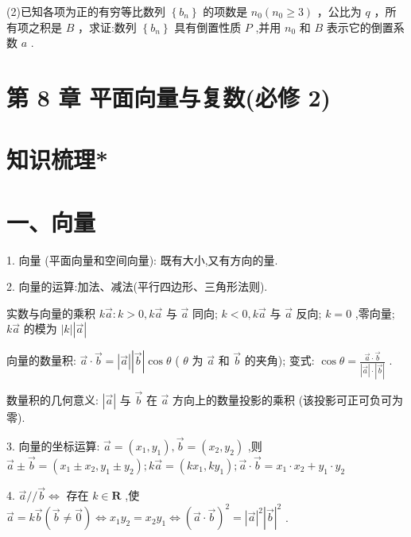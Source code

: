 (2)已知各项为正的有穷等比数列 $\left\{  {b}_{n}\right\}$ 的项数是 ${n}_{0}\left( {{n}_{0} \geq  3}\right)$ ，公比为 $q$ ，所有项之积是 $B$ ，求证:数列 $\left\{  {b}_{n}\right\}$ 具有倒置性质 $P$ ,并用 ${n}_{0}$ 和 $B$ 表示它的倒置系数 $a$ .


\section*{第 8 章 平面向量与复数(必修 2)}

\section*{知识梳理*}

\section*{一、向量}

1. 向量 (平面向量和空间向量): 既有大小,又有方向的量.

2. 向量的运算:加法、减法(平行四边形、三角形法则).

实数与向量的乘积 $k\overrightarrow{a} : k > 0,k\overrightarrow{a}$ 与 $\overrightarrow{a}$ 同向; $k < 0,k\overrightarrow{a}$ 与 $\overrightarrow{a}$ 反向; $k = 0$ ,零向量; $k\overrightarrow{a}$ 的模为 $\left| k\right| \left| \overrightarrow{a}\right|$

向量的数量积: $\overrightarrow{a} \cdot  \overrightarrow{b} = \left| \overrightarrow{a}\right| \left| \overrightarrow{b}\right| \cos \theta$ ( $\theta$ 为 $\overrightarrow{a}$ 和 $\overrightarrow{b}$ 的夹角); 变式: $\cos \theta  = \frac{\overrightarrow{a} \cdot  \overrightarrow{b}}{\left| \overrightarrow{a}\right|  \cdot  \left| \overrightarrow{b}\right| }$ .

数量积的几何意义: $\left| \overrightarrow{a}\right|$ 与 $\overrightarrow{b}$ 在 $\overrightarrow{a}$ 方向上的数量投影的乘积 (该投影可正可负可为零).

3. 向量的坐标运算: $\overrightarrow{a} = \left( {{x}_{1},{y}_{1}}\right) ,\overrightarrow{b} = \left( {{x}_{2},{y}_{2}}\right)$ ,则 $\overrightarrow{a} \pm  \overrightarrow{b} = \left( {{x}_{1} \pm  {x}_{2},{y}_{1} \pm  {y}_{2}}\right) ;k\overrightarrow{a} = \left( {k{x}_{1},k{y}_{1}}\right) ;\overrightarrow{a} \cdot  \overrightarrow{b} =  {x}_{1} \cdot  {x}_{2} + {y}_{1} \cdot  {y}_{2}$

4. $\overrightarrow{a}//\overrightarrow{b} \Leftrightarrow$ 存在 $k \in  \mathbf{R}$ ,使 $\overrightarrow{a} = k\overrightarrow{b}\left( {\overrightarrow{b} \neq  \overrightarrow{0}}\right)  \Leftrightarrow  {x}_{1}{y}_{2} = {x}_{2}{y}_{1} \Leftrightarrow  {\left( \overrightarrow{a} \cdot  \overrightarrow{b}\right) }^{2} = {\left| \overrightarrow{a}\right| }^{2}{\left| \overrightarrow{b}\right| }^{2}$ .

